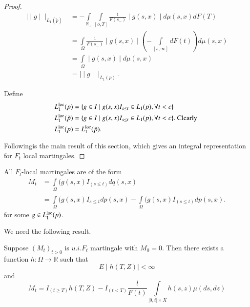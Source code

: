 \begin{proof}
  \begin{align*}
    \mid\mid g \mid\mid_{L_{1} ( \tilde{p})} &= -  \int
    \limits_{\mathbb{R}_+} \int \limits_{[o, T ] } \frac{1}{F (s_-)}
        \mid g (s,x)  \mid d \mu (s,x) d F (T) \\ 
        &= \int \limits_{\Omega} \frac{1}{F (s_-)} \mid g (s,x)\mid( -\int
        \limits_{[ s, \infty ]} d F(t)) d \mu (s,x) \\ 
        &= \int \limits_{\Omega} \mid g (s, x) \mid d\mu (s,x) \\
        &= \mid\mid g \mid\mid _{L_{1} (p)}.
  \end{align*}

Define
\begin{align*}
  L^{\operatorname{loc}}_{1} (p) &=  \{ g \in  I \mid g (s,x) I_{s \leq t }
  \in  L_{1} (p), \forall t < c \} \\ 
  L^{\operatorname{loc}}_{1} (\tilde{p} ) &= \{ g \in  I \mid g (s,x) I_{s
    \leq t } \in  L_{1} (p), \forall t < c \}. \text{ Clearly }
  \\ 
 L^{\operatorname{loc}}_{1} (p) &= L^{\operatorname{loc}}_{1} (\tilde{p} ).
\end{align*}

Following\pageoriginale is the main result of this section, which
gives an integral representation for $F_t$ local martingales. 
\end{proof}

\begin{prop}\label{chap1:prop1.7}%
  All $ F_t$-local martingales are of the form 
  \begin{align*}
    M_t &= \int \limits_{\Omega} (g (s,x) I_{(s \leq t)} dq(s,x) \\
    &= \int \limits_{\Omega} (g (s,x) I_{s \leq t} dp(s,x) -\int
    \limits_{\Omega} (g (s,x) I_{(s \leq t)} \tilde{dp}(s,x). 
  \end{align*}
for some $g\in  L^{\operatorname{loc}}_{1} (p) $.
\end{prop}

We need the following result.

\begin{lemma}%
  Suppose  $(M_t)_{t > 0} $ is $ u.i. F_t$ martingale with $ M_0 = 0
  $. Then there exists a function  $ h: \Omega \rightarrow \mathbb{R} $
  such that 
  \begin{equation*}
    E \mid h (T, Z ) \mid < \infty \tag{1}\label{chap1:sec1:eq1}
  \end{equation*}
  and
  \begin{equation*}
    M_t = I_{( t \ge T )} h (T,Z) -I_{(t < T)} \frac{l}{F (t)} \int
    \limits_{] 0, t] \times X } h (s,z) \mu (ds,dz)
        \tag{2}\label{chap1:sec1:eq2}  
  \end{equation*}
\end{lemma}

